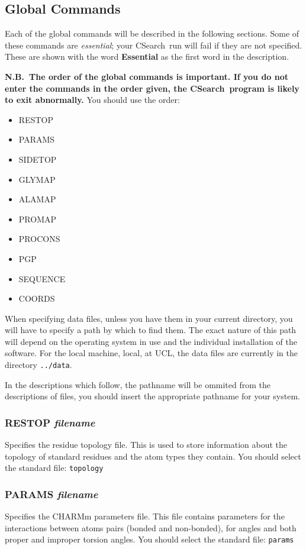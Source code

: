 \documentclass{report}
\newcommand{\cs}{CSearch}
\newcommand{\localmachine}{local}
\newcommand{\site}{UCL}
\newcommand{\localdat}{{\tt ../data}}
\newcommand{\es}{\relax}
\begin{document}
\subsection{Global Commands}
Each of the global commands will be described in the following sections.
Some of these commands are {\em essential}; your \cs\ run will fail if they
are not specified. These are shown with the word {\bf Essential} as the 
first word in the description.

{\bf N.B.~The order of the global commands is important. If you do not
enter the commands in the order given, the \cs\ program is likely to exit
abnormally.} You should use the order:
\begin{itemize}
\item RESTOP
\item PARAMS
\item SIDETOP
\item GLYMAP
\item ALAMAP
\item PROMAP
\item PROCONS
\item PGP
\item SEQUENCE
\item COORDS
\end{itemize}

When specifying data files, unless you have them in your current directory,
you will have to specify a path by which to find them. The exact nature
of this path will depend on the operating system in use and the individual
installation of the software. For the local machine, \localmachine, at
\site, the data files are currently in the directory \localdat.

In the descriptions which follow, the pathname will be ommited from the
descriptions of files, you should insert the appropriate pathname for
your system.

\subsubsection{RESTOP {\em filename}}
\es
Specifies the residue topology file. This is used to store information
about the topology of standard residues and the atom types they contain.
You should select the standard file: {\tt topology}

\subsubsection{PARAMS {\em filename}}
\es
Specifies the CHARMm parameters file. This file contains parameters for
the interactions between atoms pairs (bonded and non-bonded), for
angles and both proper and improper torsion angles. You should select the
standard file: {\tt params}
\end{document}
